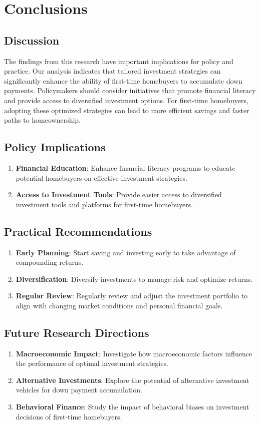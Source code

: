 \section{Conclusions}
\subsection{Discussion}
The findings from this research have important implications for policy and practice. Our analysis indicates that tailored investment strategies can significantly enhance the ability of first-time homebuyers to accumulate down payments. Policymakers should consider initiatives that promote financial literacy and provide access to diversified investment options. For first-time homebuyers, adopting these optimized strategies can lead to more efficient savings and faster paths to homeownership.

\subsection{Policy Implications}
\begin{enumerate}
    \item \textbf{Financial Education}: Enhance financial literacy programs to educate potential homebuyers on effective investment strategies.
    \item \textbf{Access to Investment Tools}: Provide easier access to diversified investment tools and platforms for first-time homebuyers.
\end{enumerate}

\subsection{Practical Recommendations}
\begin{enumerate}
    \item \textbf{Early Planning}: Start saving and investing early to take advantage of compounding returns.
    \item \textbf{Diversification}: Diversify investments to manage risk and optimize returns.
    \item \textbf{Regular Review}: Regularly review and adjust the investment portfolio to align with changing market conditions and personal financial goals.
\end{enumerate}

\subsection{Future Research Directions}
\begin{enumerate}
    \item \textbf{Macroeconomic Impact}: Investigate how macroeconomic factors influence the performance of optimal investment strategies.
    \item \textbf{Alternative Investments}: Explore the potential of alternative investment vehicles for down payment accumulation.
    \item \textbf{Behavioral Finance}: Study the impact of behavioral biases on investment decisions of first-time homebuyers.
\end{enumerate}

